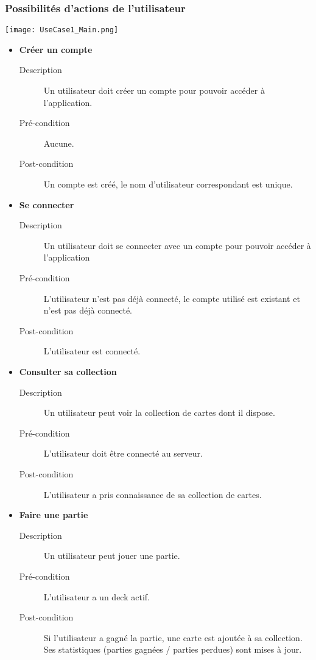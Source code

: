 \documentclass{article}
\begin{document}
		\subsubsection{Possibilités d'actions de l'utilisateur}
			\begin{center}\texttt{[image: UseCase1\_Main.png]}\end{center}
			\begin{itemize}
				\item \textbf{Créer un compte}
				\begin{description}
					\item[Description] Un utilisateur doit créer un compte pour pouvoir accéder à l'application.
					\item[Pré-condition] Aucune.
					\item[Post-condition] Un compte est créé, le nom d'utilisateur correspondant est unique.\\
				\end{description}

				\item \textbf{Se connecter}
				\begin{description}
					\item[Description] Un utilisateur doit se connecter avec un compte pour pouvoir accéder à l'application
					\item[Pré-condition] L'utilisateur n'est pas déjà connecté, le compte utilisé est existant et n'est pas déjà connecté.
					\item[Post-condition] L'utilisateur est connecté.\\
				\end{description}

				\item \textbf{Consulter sa collection}
				\begin{description}
					\item[Description] Un utilisateur peut voir la collection de cartes dont il dispose.
					\item[Pré-condition] L'utilisateur doit être connecté au serveur.
					\item[Post-condition] L'utilisateur a pris connaissance de sa collection de cartes.\\
				\end{description}

				\item \textbf{Faire une partie}
				\begin{description}
					\item[Description] Un utilisateur peut jouer une partie.
					\item[Pré-condition] L'utilisateur a un deck actif.
					\item[Post-condition] Si l'utilisateur a gagné la partie, une carte est ajoutée à sa collection.
					Ses statistiques (parties gagnées / parties perdues) sont mises à jour.\\
				\end{description}


\end{itemize}
\end{document}
